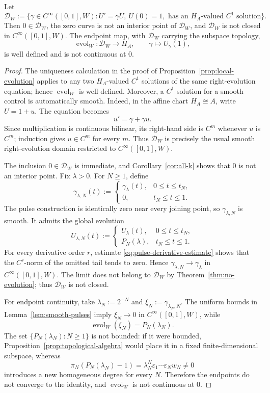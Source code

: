 \documentclass[10pt,a4paper]{amsart}
\begin{document}
\begin{corollary}
\label{cor:evolution-domain}
Let
\[
  \mathcal D_W:=\{\gamma\in C^\infty([0,1],W):
  U'=\gamma U,\ U(0)=1,
  \text{ has an $H_A$-valued $C^1$ solution}\}.
\]
Then $0\in\mathcal D_W$, the zero curve is not an interior point of
$\mathcal D_W$, and $\mathcal D_W$ is not closed in
$C^\infty([0,1],W)$.  The endpoint map, with $\mathcal D_W$ carrying the
subspace topology,
\[
  \operatorname{evol}_W:\mathcal D_W\to H_A,
  \qquad \gamma\mapsto U_\gamma(1),
\]
is well defined and is not continuous at $0$.
\end{corollary}

\begin{proof}
The uniqueness calculation in the proof of
Proposition~\ref{prop:local-evolution} applies to any two $H_A$-valued
$C^1$ solutions of the same right-evolution equation; hence
$\operatorname{evol}_W$ is well defined.  Moreover, a $C^1$ solution for a
smooth control is automatically smooth.  Indeed, in the affine chart
$H_A\cong A$, write $U=1+u$.  The equation becomes
\[
  u'=\gamma+\gamma u.
\]
Since multiplication is continuous bilinear, its right-hand side is $C^m$
whenever $u$ is $C^m$; induction gives $u\in C^m$ for every $m$.
Thus $\mathcal D_W$ is precisely the usual smooth right-evolution domain
restricted to $C^\infty([0,1],W)$.

The inclusion $0\in\mathcal D_W$ is immediate, and
Corollary~\ref{cor:all-k} shows that $0$ is not an interior point.  Fix
$\lambda>0$.  For $N\geq1$, define
\[
  \gamma_{\lambda,N}(t):=
  \begin{cases}
    \gamma_\lambda(t),&0\leq t\leq t_N,\\
    0,&t_N\leq t\leq1.
  \end{cases}
\]
The pulse construction is identically zero near every joining point, so
$\gamma_{\lambda,N}$ is smooth.  It admits the global evolution
\[
  U_{\lambda,N}(t):=
  \begin{cases}
    U_\lambda(t),&0\leq t\leq t_N,\\
    P_N(\lambda),&t_N\leq t\leq1.
  \end{cases}
\]
For every derivative order $r$, estimate
\eqref{eq:pulse-derivative-estimate} shows that the $C^r$-norm of the omitted
tail tends to zero.  Hence
$\gamma_{\lambda,N}\to\gamma_\lambda$ in
$C^\infty([0,1],W)$.  The limit does not belong to $\mathcal D_W$ by
Theorem~\ref{thm:no-evolution}; thus $\mathcal D_W$ is not closed.

For endpoint continuity, take $\lambda_N:=2^{-N}$ and
$\xi_N:=\gamma_{\lambda_N,N}$.  The uniform bounds in
Lemma~\ref{lem:smooth-pulses} imply $\xi_N\to0$ in
$C^\infty([0,1],W)$, while
\[
  \operatorname{evol}_W(\xi_N)=P_N(\lambda_N).
\]
The set $\{P_N(\lambda_N):N\geq1\}$ is not bounded: if it were bounded,
Proposition~\ref{prop:topological-algebra} would place it in a fixed
finite-dimensional subspace, whereas
\[
  \pi_N(P_N(\lambda_N)-1)
  =\lambda_N^N\varepsilon_1\cdots\varepsilon_Nw_N\neq0
\]
introduces a new homogeneous degree for every $N$.  Therefore the endpoints
do not converge to the identity, and $\operatorname{evol}_W$ is not
continuous at $0$.
\end{proof}
\end{document}
